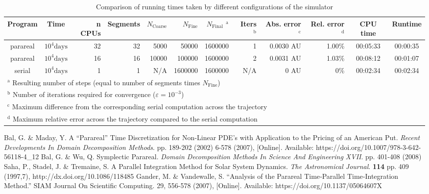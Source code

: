 \documentclass[conference]{IEEEtran}
\begin{document}
\begin{table*}[htbp]
\caption{Comparison of running times taken by different configurations of the simulator}
\begin{center}
\begin{tabular}{ccrrrrrrrrcc}
\toprule
Program & Time &  n CPUs & Segments & $N_\text{Coarse}$ & $N_{\text{Fine}}$ & $N_{\text{Final}}$ $^{\mathrm{a}}$ & Iters $^{\mathrm{b}}$ & Abs. error $^{\mathrm{c}}$ & Rel. error $^{\mathrm{d}}$ & CPU time & Runtime \\
\midrule
parareal & $10^4\text{days}$ & 32 & 32 &  5000 &  50000 & 1600000 & 1 & 0.0030 AU & 1.00\% & 00:05:33 & 00:00:35 \\
parareal & $10^4\text{days}$ & 16 & 16 & 10000 & 100000 & 1600000 & 2 & 0.0031 AU & 1.03\% & 00:08:12 & 00:01:07 \\
serial & $10^4\text{days}$ & 1 & 1 & N/A & 1600000 & 1600000 & N/A & 0 AU & 0\% & 00:02:34 & 00:02:34 \\
\bottomrule
\multicolumn{11}{l}{$^{\mathrm{a}}$ Resulting number of steps (equal to number of segments times $N_\text{Fine}$)} \\
\multicolumn{11}{l}{$^{\mathrm{b}}$ Number of iterations required for convergence ($\varepsilon = 10^{-3}$)} \\
\multicolumn{11}{l}{$^{\mathrm{c}}$ Maximum difference from the corresponding serial computation across the trajectory} \\
\multicolumn{11}{l}{$^{\mathrm{d}}$ Maximum relative error across the trajectory compared to the serial computation}
\end{tabular}
\label{runtimes}
\end{center}
\end{table*}

\begin{thebibliography}{00}
Bal, G. \& Maday, Y. A “Parareal” Time Discretization for Non-Linear PDE's with Application to the Pricing of an American Put. {\em Recent Developments In Domain Decomposition Methods}. pp. 189-202 (2002)
6-578 (2007), [Online]. Available: https://doi.org/10.1007/978-3-642-56118-4\_12
Bal, G. \& Wu, Q. Symplectic Parareal. {\em Domain Decomposition Methods In Science And Engineering XVII}. pp. 401-408 (2008)
Saha, P., Stadel, J. \& Tremaine, S. A Parallel Integration Method for Solar System Dynamics. {\em The Astronomical Journal}. \textbf{114} pp. 409 (1997,7), http://dx.doi.org/10.1086/118485
Gander, M. \& Vandewalle, S. ``Analysis of the Parareal Time‐Parallel Time‐Integration Method.'' SIAM Journal On Scientific Computing. 29, 556-578 (2007), [Online]. Available: https://doi.org/10.1137/05064607X
\end{thebibliography}
\end{document}
